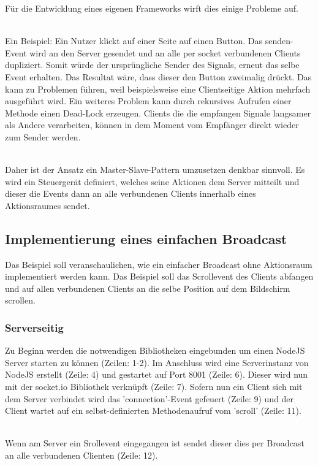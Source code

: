 Für die Entwicklung eines eigenen Frameworks wirft dies einige Probleme auf.

\\ Ein  Beispiel: Ein Nutzer klickt auf einer Seite auf einen Button. Das senden-Event wird an den Server gesendet und an alle per socket verbundenen Clients dupliziert. Somit würde der ursprüngliche Sender des Signals, erneut das selbe Event erhalten. Das Resultat wäre, dass dieser den Button zweimalig drückt. Das kann zu Problemen führen, weil beispielsweise eine Clientseitige Aktion mehrfach ausgeführt wird. Ein weiteres Problem kann durch rekursives Aufrufen einer Methode einen Dead-Lock erzeugen. Clients die die empfangen Signale langsamer als Andere verarbeiten, können in dem Moment vom Empfänger direkt wieder zum Sender werden.
	
	\\Daher ist der Ansatz ein Master-Slave-Pattern umzusetzen denkbar sinnvoll. Es wird ein Steuergerät definiert, welches seine Aktionen dem Server mitteilt und dieser die Events dann an alle verbundenen Clients innerhalb eines Aktionsraumes sendet.
	
	
	\subsection{Implementierung eines einfachen Broadcast}
	Das Beispiel soll veranschaulichen, wie ein einfacher Broadcast ohne Aktionsraum implementiert werden kann. Das Beispiel soll das Scrollevent des Clients abfangen und auf allen verbundenen Clients an die selbe Position auf dem Bildschirm scrollen.
	
	\subsubsection{Serverseitig}
	Zu Beginn werden die notwendigen Bibliotheken eingebunden um einen NodeJS Server starten zu können (Zeilen: 1-2). Im Anschluss wird  eine Serverinstanz von NodeJS erstellt (Zeile: 4) und gestartet auf Port 8001 (Zeile: 6). Dieser wird nun mit der socket.io Bibliothek verknüpft (Zeile: 7). Sofern nun ein Client sich mit dem Server verbindet wird das 'connection'-Event gefeuert (Zeile: 9) und der Client wartet auf ein selbst-definierten Methodenaufruf vom 'scroll' (Zeile: 11).
	
	\\Wenn am Server ein Srollevent eingegangen ist sendet dieser dies per Broadcast an alle verbundenen Clienten (Zeile: 12).
	
